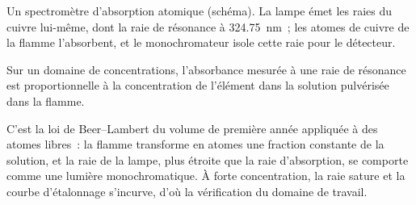 \begin{omfigure}
\par\vspace{4pt}

{\small Un spectromètre d'absorption atomique (schéma). La lampe émet les raies du cuivre lui-même, dont
la raie de résonance à \qty{324.75}{nm}~; les atomes de cuivre de la flamme l'absorbent, et le
monochromateur isole cette raie pour le détecteur.}
\end{omfigure}

\begin{proposition}\label{prop:b2:mass-spec-atomic:aas}
Sur un domaine de concentrations, l'absorbance mesurée à une raie de résonance est proportionnelle à la
concentration de l'élément dans la solution pulvérisée dans la flamme.
\end{proposition}

\admitted

C'est la loi de Beer--Lambert du volume de première année appliquée à des atomes libres~: la flamme
transforme en atomes une fraction constante de la solution, et la raie de la lampe, plus étroite que la
raie d'absorption, se comporte comme une lumière monochromatique. À forte concentration, la raie sature et
la courbe d'étalonnage s'incurve, d'où la vérification du domaine de travail.

